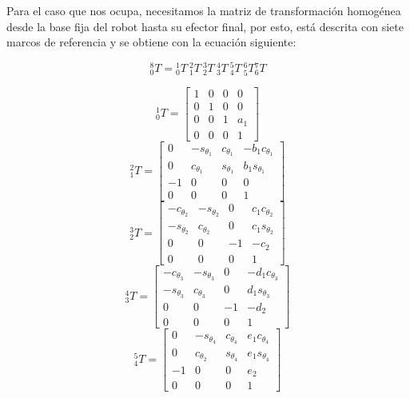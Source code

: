 Para el caso que nos ocupa, necesitamos la matriz de transformación homogénea desde la base fija del robot hasta su efector final, por esto, está descrita con siete marcos de referencia y se obtiene con la ecuación siguiente:

\begin{equation}
\label{eq:forwardkinematicequation}
{}_{0}^{8}T = {}_{0}^{1}T \ {}_{1}^{2}T \ {}_{2}^{3}T \ {}_{3}^{4}T \ {}_{4}^{5}T \ {}_{5}^{6}T {}_{6}^{7}T
\end{equation}

\begin{multicols}{2}
\[
{}_{0}^{1}T = 
\begin{bmatrix}
    1 & 0 & 0 & 0 \\
    0 & 1 & 0 & 0 \\
    0 & 0 & 1 & {a}_1 \\
    0 & 0 & 0 & 1
\end{bmatrix}
\]
\[
{}_{1}^{2}T = 
\begin{bmatrix}
    0 & -s_{\theta_1} & c_{\theta_1} & -b_{1}c_{\theta_1}  \\
    0 & c_{\theta_1} & s_{\theta_1} & b_{1}s_{\theta_1} \\
    -1 & 0 & 0 & 0 \\
    0 & 0 & 0 & 1
\end{bmatrix}
\]
\[
{}_{2}^{3}T = 
\begin{bmatrix}
    -c_{\theta_2} & -s_{\theta_2} & 0 & c_{1}c_{\theta_2}  \\
    -s_{\theta_2} & c_{\theta_2} & 0 & c_{1}s_{\theta_2} \\
    0 & 0 & -1 & -c_2 \\
    0 & 0 & 0 & 1
\end{bmatrix}
\]
\[
{}_{3}^{4}T = 
\begin{bmatrix}
    -c_{\theta_3} & -s_{\theta_3} & 0 & -d_{1}c_{\theta_3}  \\
    -s_{\theta_3} & c_{\theta_3} & 0 & d_{1}s_{\theta_3} \\
    0 & 0 & -1 & -d_2 \\
    0 & 0 & 0 & 1
\end{bmatrix}
\]
\[
{}_{4}^{5}T = 
\begin{bmatrix}
    0 & -s_{\theta_4} & c_{\theta_4} & e_{1}c_{\theta_4}  \\
    0 & c_{\theta_2} & s_{\theta_4} & e_{1}s_{\theta_4} \\
    -1 & 0 & 0 & e_2 \\
    0 & 0 & 0 & 1
\end{bmatrix}
\]


\end{multicols}
